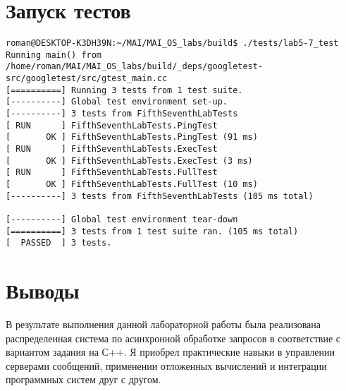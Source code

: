 \documentclass[a4paper, 12pt]{article}
\begin{document}
\section{Запуск тестов}
\begin{verbatim}
roman@DESKTOP-K3DH39N:~/MAI/MAI_OS_labs/build$ ./tests/lab5-7_test 
Running main() from /home/roman/MAI/MAI_OS_labs/build/_deps/googletest-src/googletest/src/gtest_main.cc
[==========] Running 3 tests from 1 test suite.
[----------] Global test environment set-up.
[----------] 3 tests from FifthSeventhLabTests
[ RUN      ] FifthSeventhLabTests.PingTest
[       OK ] FifthSeventhLabTests.PingTest (91 ms)
[ RUN      ] FifthSeventhLabTests.ExecTest
[       OK ] FifthSeventhLabTests.ExecTest (3 ms)
[ RUN      ] FifthSeventhLabTests.FullTest
[       OK ] FifthSeventhLabTests.FullTest (10 ms)
[----------] 3 tests from FifthSeventhLabTests (105 ms total)

[----------] Global test environment tear-down
[==========] 3 tests from 1 test suite ran. (105 ms total)
[  PASSED  ] 3 tests.
\end{verbatim}
\newpage

\section{Выводы}

В результате выполнения данной лабораторной работы была реализована распределенная система по асинхронной обработке запросов в соответствие с вариантом задания на С++. Я приобрел практические навыки в управлении серверами сообщений, применении отложенных вычислений и интеграции программных систем друг с другом.
\end{document}
